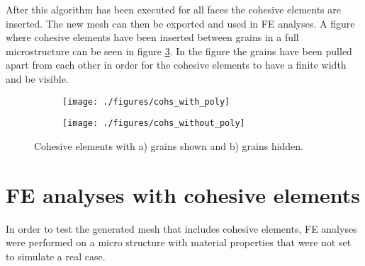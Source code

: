 \documentclass[grain_boundary_law.tex]{subfiles}
\begin{document}
After this algorithm has been executed for all faces the cohesive elements are inserted. The new mesh can then be exported and used in FE analyses. A figure where cohesive elements have been inserted between grains in a full microstructure can be seen in figure \ref{fig:cohs_large}. In the figure the grains have been pulled apart from each other in order for the cohesive elements to have a finite width and be visible.



\begin{figure}[htpb!]
\centering
\begin{subfigure}[b]{.5\textwidth}
  \centering
  \texttt{[image: ./figures/cohs\_with\_poly]}
  \caption{}
  \label{fig:cohs_large_a}
\end{subfigure}%
\begin{subfigure}[b]{.5\textwidth}
  \centering
  \texttt{[image: ./figures/cohs\_without\_poly]}
  \caption{}
  \label{fig:cohs_large_b}
\end{subfigure}
\caption{Cohesive elements with a) grains shown and b) grains hidden.}
\label{fig:cohs_large}
\end{figure}


\section{FE analyses with cohesive elements}

In order to test the generated mesh that includes cohesive elements, FE analyses were performed on a micro structure with material properties that were not set to simulate a real case.
\end{document}
